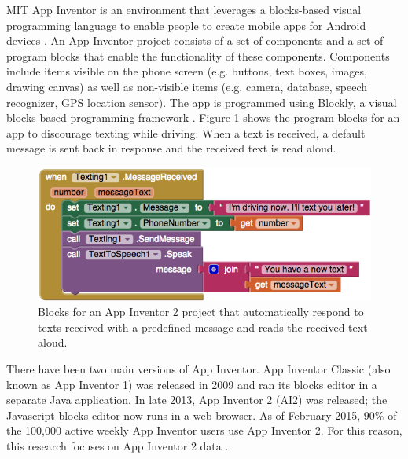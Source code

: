 \documentclass[conference]{IEEEtran}
\begin{document}




 

MIT App Inventor is an environment that leverages a blocks-based visual programming language to enable people to create mobile apps for Android devices \cite{ai_home}. An App Inventor project consists of a set of components and a set of program blocks that enable the functionality of these components. Components include items visible on the phone screen (e.g. buttons, text boxes, images, drawing canvas) as well as non-visible items (e.g. camera, database, speech recognizer, GPS location sensor). The app is programmed using Blockly, a visual blocks-based programming framework \cite{blockly}. Figure 1 shows the program blocks for an app to discourage texting while driving. When a text is received, a default message is sent back in response and the received text is read aloud. 

\begin{figure}[h!]
	\centering
	\includegraphics[width=0.95\linewidth]{fig1.png}
	\caption{Blocks for an App Inventor 2 project that automatically respond to texts received with a predefined message and reads the received text aloud.}
	\label{example_blocks}
\end{figure}

There have been two main versions of App Inventor. App Inventor Classic (also known as App Inventor 1) was released in 2009 and ran its blocks editor in a separate Java application. In late 2013, App Inventor 2 (AI2) was released; the Javascript blocks editor now runs in a web browser. As of February 2015, 90\% of the 100,000 active weekly App Inventor users use App Inventor 2. For this reason, this research focuses on App Inventor 2 data \cite{naming:turbak}.
\end{document}

